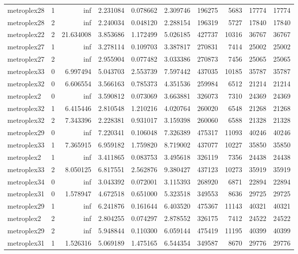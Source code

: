 \begin{longtable}{|l|r|r|r|r|r|r|r|r|r|}
metroplex28 & 1 & inf & 2.231084 & 0.078662 & 2.309746 & 196275 & 5683 & 17774 & 17774 \\
metroplex28 & 2 & inf & 2.240034 & 0.048120 & 2.288154 & 196319 & 5727 & 17840 & 17840 \\
metroplex22 & 2 & 21.634008 & 3.853686 & 1.172499 & 5.026185 & 427737 & 10316 & 36767 & 36767 \\
metroplex27 & 1 & inf & 3.278114 & 0.109703 & 3.387817 & 270831 & 7414 & 25002 & 25002 \\
metroplex27 & 2 & inf & 2.955904 & 0.077482 & 3.033386 & 270873 & 7456 & 25065 & 25065 \\
metroplex33 & 0 & 6.997494 & 5.043703 & 2.553739 & 7.597442 & 437035 & 10185 & 35787 & 35787 \\
metroplex32 & 0 & 6.606554 & 3.566163 & 0.785373 & 4.351536 & 259984 & 6512 & 21214 & 21214 \\
metroplex2 & 0 & inf & 3.590812 & 0.073069 & 3.663881 & 326073 & 7310 & 24369 & 24369 \\
metroplex32 & 1 & 6.415446 & 2.810548 & 1.210216 & 4.020764 & 260020 & 6548 & 21268 & 21268 \\
metroplex32 & 2 & 7.343396 & 2.228381 & 0.931017 & 3.159398 & 260060 & 6588 & 21328 & 21328 \\
metroplex29 & 0 & inf & 7.220341 & 0.106048 & 7.326389 & 475317 & 11093 & 40246 & 40246 \\
metroplex33 & 1 & 7.365915 & 6.959182 & 1.759820 & 8.719002 & 437077 & 10227 & 35850 & 35850 \\
metroplex2 & 1 & inf & 3.411865 & 0.083753 & 3.495618 & 326119 & 7356 & 24438 & 24438 \\
metroplex33 & 2 & 8.050125 & 6.817551 & 2.562876 & 9.380427 & 437123 & 10273 & 35919 & 35919 \\
metroplex34 & 0 & inf & 3.043392 & 0.072001 & 3.115393 & 268920 & 6871 & 22894 & 22894 \\
metroplex31 & 0 & 1.578947 & 4.672518 & 0.651000 & 5.323518 & 349553 & 8636 & 29725 & 29725 \\
metroplex29 & 1 & inf & 6.241876 & 0.161644 & 6.403520 & 475367 & 11143 & 40321 & 40321 \\
metroplex2 & 2 & inf & 2.804255 & 0.074297 & 2.878552 & 326175 & 7412 & 24522 & 24522 \\
metroplex29 & 2 & inf & 5.948844 & 0.110300 & 6.059144 & 475419 & 11195 & 40399 & 40399 \\
metroplex31 & 1 & 1.526316 & 5.069189 & 1.475165 & 6.544354 & 349587 & 8670 & 29776 & 29776 \\

\end{longtable}
